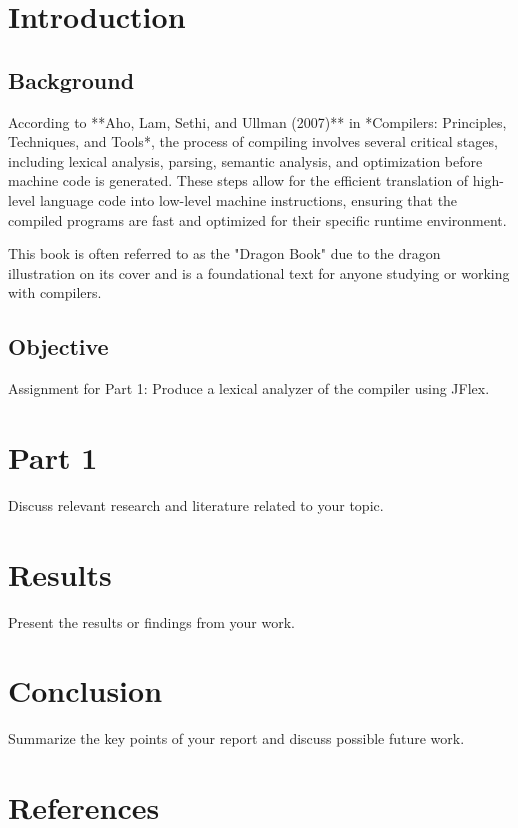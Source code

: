 \documentclass[12pt,a4paper]{report}
\begin{document}
	
	\tableofcontents
	\newpage
	
	\listoftables
	\newpage
	
	\chapter{Introduction}
	\section{Background}
	According to **Aho, Lam, Sethi, and Ullman (2007)** in *Compilers: Principles, Techniques, and Tools*, the process of compiling involves several critical stages, including lexical analysis, parsing, semantic analysis, and optimization before machine code is generated. These steps allow for the efficient translation of high-level language code into low-level machine instructions, ensuring that the compiled programs are fast and optimized for their specific runtime environment.
	
	This book is often referred to as the "Dragon Book" due to the dragon illustration on its cover and is a foundational text for anyone studying or working with compilers.
	
	\section{Objective}
		Assignment for Part 1: Produce a lexical analyzer of the compiler using JFlex.\\
	
	\chapter{Part 1}
	Discuss relevant research and literature related to your topic.
	
	
	
	\chapter{Results}
	Present the results or findings from your work.
	
	\chapter{Conclusion}
	Summarize the key points of your report and discuss possible future work.
	
	\chapter*{References}
	
	
\end{document}
